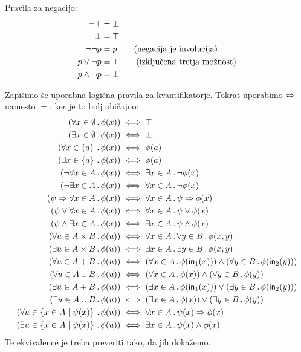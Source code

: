 %
Pravila za negacijo:
%
\begin{align}
  \neg \top  &= \bot \notag \\
  \neg \bot &= \top \notag \\
  \neg\neg p &= p \tag{negacija je involucija} \\
  p \lor \neg p &= \top \tag{izključena tretja možnost} \\
  p \land \neg p &= \bot \notag
\end{align}

Zapišimo še uporabna logična pravila za kvantifikatorje. Tokrat uporabimo $\Leftrightarrow$
namesto $=$, ker je to bolj običajno:
%
\begin{align*}
  (\forall x \in \emptyset \,.\, \phi(x))   &\iff   \top \\
  (\exists x \in \emptyset \,.\, \phi(x))   &\iff   \bot \\
  (\forall x \in \left\{a\right\} \,.\, \phi(x))   &\iff   \phi(a) \\
  (\exists x \in \left\{a\right\} \,.\, \phi(x))   &\iff   \phi(a) \\
  (\neg \forall x \in A \,.\, \phi(x))   &\iff   \exists x \in A \,.\, \neg \phi(x) \\
  (\neg \exists x \in A \,.\, \phi(x))   &\iff   \forall x \in A \,.\, \neg \phi(x) \\
  (\psi \Rightarrow \forall x \in A \,.\, \phi(x))   &\iff   \forall x \in A \,.\, \psi \Rightarrow \phi(x) \\
  (\psi \lor \forall x \in A \,.\, \phi(x))   &\iff   \forall x \in A \,.\, \psi \lor \phi(x) \\
  (\psi \land \exists x \in A \,.\, \phi(x))   &\iff   \exists x \in A \,.\, \psi \land \phi(x) \\
  (\forall u \in A \times B \,.\, \phi(u))   &\iff   \forall x \in A \,.\, \forall y \in B \,.\, \phi(x, y) \\
  (\exists u \in A \times B \,.\, \phi(u))   &\iff   \exists x \in A \,.\, \exists y \in B \,.\, \phi(x, y) \\
  (\forall u \in A + B \,.\, \phi(u))   &\iff   (\forall x \in A \,.\, \phi(\mathsf{in}_{1}(x))) \land (\forall y \in B \,.\, \phi(\mathsf{in}_{2}(y))) \\
  (\forall u \in A \cup B \,.\, \phi(u))   &\iff   (\forall x \in A \,.\, \phi(x)) \land (\forall y \in B \,.\, \phi(y)) \\
  (\exists u \in A + B \,.\, \phi(u))   &\iff   (\exists x \in A \,.\, \phi(\mathsf{in}_{1}(x))) \lor (\exists y \in B \,.\, \phi(\mathsf{in}_{2}(y))) \\
  (\exists u \in A \cup B \,.\, \phi(u))   &\iff   (\exists x \in A \,.\, \phi(x)) \lor (\exists y \in B \,.\, \phi(y)) \\
  (\forall u \in \left\{x \in A \; \middle| \; \psi(x)\right\} \,.\, \phi(u))   &\iff   \forall x \in A \,.\, \psi(x) \Rightarrow \phi(x) \\
  (\exists u \in \left\{x \in A \; \middle| \; \psi(x)\right\} \,.\, \phi(u))   &\iff   \exists x \in A \,.\, \psi(x) \land \phi(x)
\end{align*}
%
Te ekvivalence je treba preveriti tako, da jih dokažemo.

